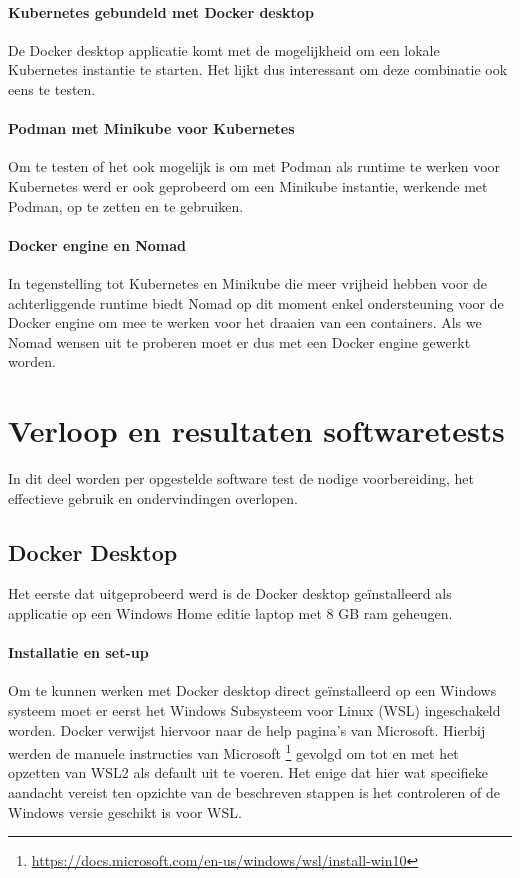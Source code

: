\paragraph{Kubernetes gebundeld met Docker desktop}
De Docker desktop applicatie komt met de mogelijkheid om een lokale Kubernetes instantie te starten. Het lijkt dus interessant om deze combinatie ook eens te testen.

\paragraph{Podman met Minikube voor Kubernetes}
Om te testen of het ook mogelijk is om met Podman als runtime te werken voor Kubernetes werd er ook geprobeerd om een Minikube instantie, werkende met Podman, op te zetten en te gebruiken.

\paragraph{Docker engine en Nomad}
In tegenstelling tot Kubernetes en Minikube die meer vrijheid hebben voor de achterliggende runtime biedt Nomad op dit moment enkel ondersteuning voor de Docker engine om mee te werken voor het draaien van een containers. Als we Nomad wensen uit te proberen moet er dus met een Docker engine gewerkt worden.

\section{Verloop en resultaten softwaretests}
In dit deel worden per opgestelde software test de nodige voorbereiding, het effectieve gebruik en ondervindingen overlopen. 

\subsection{Docker Desktop} \label{DockerDesktop}
Het eerste dat uitgeprobeerd werd is de Docker desktop geïnstalleerd als applicatie op een Windows Home editie laptop met 8 GB ram geheugen.

\paragraph{Installatie en set-up}
Om te kunnen werken met Docker desktop direct geïnstalleerd op een Windows systeem moet er eerst het Windows Subsysteem voor Linux (WSL) ingeschakeld worden. Docker verwijst hiervoor naar de help pagina’s van Microsoft. Hierbij werden de manuele instructies van Microsoft \footnote{\url{https://docs.microsoft.com/en-us/windows/wsl/install-win10}} gevolgd om tot en met het opzetten van WSL2 als default uit te voeren. Het enige dat hier wat specifieke aandacht vereist ten opzichte van de beschreven stappen is het controleren of de Windows versie geschikt is voor WSL.

